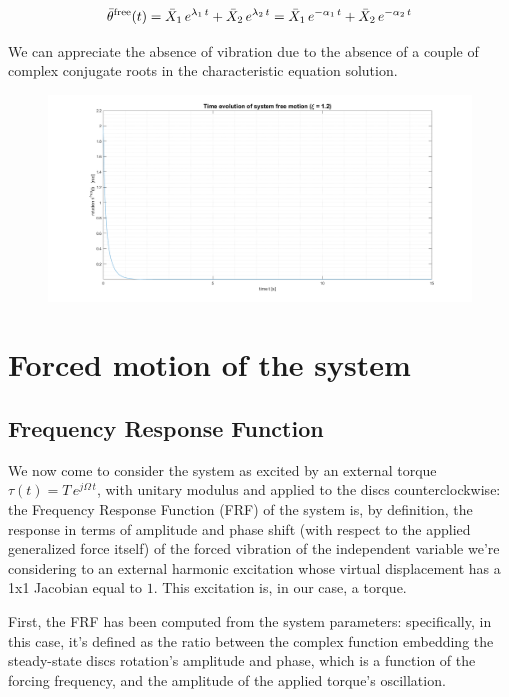 \documentclass[a4paper,12pt,oneside]{article}
\begin{document}
\[
	\bar{\theta}^\textup{free}(t) =
		\bar{X}_1 \, e^{\lambda_1 \, t} + \bar{X}_2 \, e^{\lambda_2 \, t} =
		\bar{X}_1 \, e^{-\alpha_1 \, t} + \bar{X}_2 \, e^{-\alpha_2 \, t}
\]

We can appreciate the absence of vibration due to the absence of a couple of complex conjugate roots in the characteristic equation solution.

\clearpage

\begin{figure}[h]
	\hspace{-70pt}
	\includegraphics[scale=0.4]{free_time_response_overdamped}
\end{figure}

\section{Forced motion of the system}

\subsection{Frequency Response Function}
\label{subs:frf}

We now come to consider the system as excited by an external torque $ \tau(t) = T \, e^{j \Omega \, t} $, with unitary modulus and applied to the discs counterclockwise: the Frequency Response Function (FRF) of the system is, by definition, the response in terms of amplitude and phase shift (with respect to the applied generalized force itself) of the forced vibration of the independent variable we're considering to an external harmonic excitation whose virtual displacement has a 1x1 Jacobian equal to $ 1 $. This excitation is, in our case, a torque.

First, the FRF has been computed from the system parameters: specifically, in this case, it's defined as the ratio between the complex function embedding the steady-state discs rotation's amplitude and phase, which is a function of the forcing frequency, and the amplitude of the applied torque's oscillation.
\end{document}
